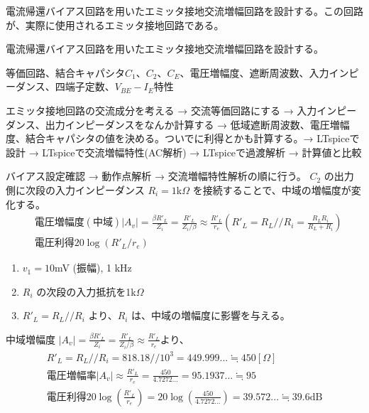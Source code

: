 電流帰還バイアス回路を用いたエミッタ接地交流増幅回路を設計する。この回路が、実際に使用されるエミッタ接地回路である。

\begin{description}
  \setlength{\parskip}{0cm} %
  \setlength{\itemsep}{0cm} %
  \item[ゴール] 電流帰還バイアス回路を用いたエミッタ接地交流増幅回路を設計する。
  \item[キーワード] 等価回路、結合キャパシタ$C_1、C_2、C_E$、電圧増幅度、遮断周波数、入力インピーダンス、四端子定数、$V_{BE}-I_E$特性
  \item[ストーリー] エミッタ接地回路の交流成分を考える → 交流等価回路にする → 入力インピーダンス、出力インピーダンスをなんか計算する → 低域遮断周波数、電圧増幅度、結合キャパシタの値を決める。ついでに利得とかも計算する。→ LTspiceで設計 → LTspiceで交流増幅特性(AC解析) → LTspiceで過渡解析 → 計算値と比較
\end{description}

バイアス設定確認 → 動作点解析 → 交流増幅特性解析の順に行う。
$C_2$ の出力側に次段の入力インピーダンス $R_i = 1$k$\Omega$ を接続することで、中域の増幅度が変化する。
\begin{align}
  & 電圧増幅度(中域) |A_v| = \frac{\beta R'_L}{Z_i} = \frac{R'_L}{Z_i/\beta} \approx \frac{R'_L}{r_e}
  (R'_L = R_L//R_i = \frac{R_LR_i}{R_L+R_i}) \\
  & 電圧利得 20 \log (R'_L/r_e)
\end{align}

\begin{enumerate}
  \setlength{\parskip}{0cm}
  \setlength{\itemsep}{0cm}  
  \item $v_1 = 10$mV (振幅), 1 kHz
  \item $R_i$ の次段の入力抵抗を1k$\Omega$
  \item $R'_L = R_L // R_i$ より、$R_i$ は、中域の増幅度に影響を与える。
\end{enumerate}
中域増幅度 $|A_v| = \frac{\beta R'_L}{Z_i} = \frac{R'_L}{Z_i/\beta} \approx \frac{R'_L}{r_e}$より、
\begin{align}
  R'_L = R_L // R_i = 818.18 // 10^{3} = 449.999... \fallingdotseq 450[\Omega]\\
  電圧増幅率 |A_v| \approx \frac{R'_L}{r_e} = \frac{450}{4.7272...} = 95.1937... \fallingdotseq 95\\
  電圧利得 20\log(\frac{R'_L}{r_e}) = 20\log(\frac{450}{4.7272...}) = 39.572... \fallingdotseq 39.6\textrm{dB}  
\end{align}

